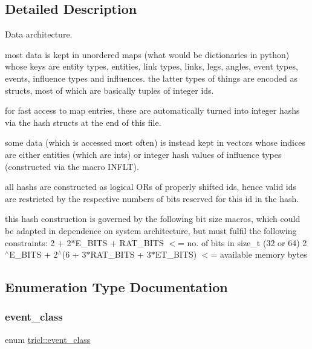 \subsection{Detailed Description}
Data architecture. 

most data is kept in unordered maps (what would be dictionaries in python) whose keys are entity types, entities, link types, links, legs, angles, event types, events, influence types and influences. the latter types of things are encoded as structs, most of which are basically tuples of integer ids.

for fast access to map entries, these are automatically turned into integer hashs via the hash structs at the end of this file.

some data (which is accessed most often) is instead kept in vectors whose indices are either entities (which are ints) or integer hash values of influence types (constructed via the macro I\+N\+F\+LT).

all hashs are constructed as logical O\+Rs of properly shifted ids, hence valid ids are restricted by the respective numbers of bits reserved for this id in the hash.

this hash construction is governed by the following bit size macros, which could be adapted in dependence on system architecture, but must fulfil the following constraints\+: 2 + 2$\ast$\+E\+\_\+\+B\+I\+TS + R\+A\+T\+\_\+\+B\+I\+TS $<$= no. of bits in size\+\_\+t (32 or 64) 2$^\wedge$\+E\+\_\+\+B\+I\+TS + 2$^\wedge$(6 + 3$\ast$\+R\+A\+T\+\_\+\+B\+I\+TS + 3$\ast$\+E\+T\+\_\+\+B\+I\+TS) $<$= available memory bytes 

\subsection{Enumeration Type Documentation}
\mbox{\label{namespacetricl_a6967089e2c0837f273d8cb5fd9f7e46d}} 
\subsubsection{\texorpdfstring{event\+\_\+class}{event\_class}}
{\footnotesize\ttfamily enum \hyperlink{namespacetricl_a6967089e2c0837f273d8cb5fd9f7e46d}{tricl\+::event\+\_\+class}}


